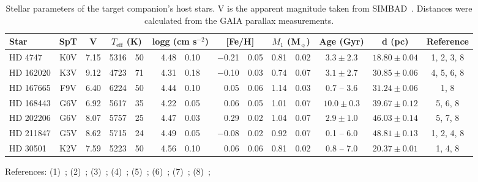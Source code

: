 
\begin{table*}
    \small
    \centering
    \begin{threeparttable}[b]
        \caption{Stellar parameters of the target companion's host stars. V is the apparent magnitude taken from {SIMBAD}~\citep{wenger_simbad_2000}. {Distances were calculated from the GAIA parallax measurements.}}
        \begin{tabular}{l c c r@{$~\pm~$}l r@{$~\pm~$}l r@{$~\pm~$}l r@{$~\pm~$}l c c c}
            \toprule
            Star & SpT & V & \multicolumn{2}{c}{\(T_{\textrm{eff}}\) (K)} &  \multicolumn{2}{c}{logg (cm s\(^{-2} \))}  & \multicolumn{2}{c}{[Fe/H]} &  \multicolumn{2}{c}{\(M_1\) (\textrm{M}\(_{\sun} \))} & Age (Gyr) & d (pc) & Reference\\
            \midrule
            {HD 4747}     & K0V & 7.15 & 5316 & 50 & 4.48 & 0.10  & $-$0.21 & 0.05 & 0.81 & 0.02  & $3.3 \pm 2.3$   & $18.80 \pm 0.04$ & 1, 2, 3, 8 \\
            {HD 162020} & K3V & 9.12 & 4723 & 71 & 4.31 & 0.18  & $-$0.10 & 0.03 & 0.74 & 0.07  & $3.1 \pm 2.7$   & $30.85 \pm 0.06$ & 4, 5, 6, 8 \\
            {HD 167665} & F9V & 6.40 & 6224 & 50 & 4.44 & 0.10  & 0.05       & 0.06 & 1.14 & 0.03  & 0.7 -- 3.6           & $ 31.24 \pm 0.06$ & 1, 8 \\
            {HD 168443} & G6V & 6.92 & 5617 & 35 & 4.22 & 0.05 & 0.06       & 0.05 & 1.01 & 0.07  & $10.0 \pm 0.3$  & $39.67 \pm 0.12$ & 5, 6, 8 \\
            {HD 202206} & G6V & 8.07 & 5757 & 25 & 4.47 & 0.03 & 0.29       & 0.02 & 1.04 & 0.07  & $2.9 \pm 1.0$    & $46.03 \pm 0.14$ & 5, 7, 8 \\
            {HD 211847} & G5V & 8.62 & 5715 & 24 & 4.49 & 0.05 & $-$0.08 & 0.02 & 0.92 & 0.07   & 0.1 -- 6.0            & $48.81 \pm 0.13 $ & 1, 2, 4, 8 \\
            {HD 30501}   & K2V & 7.59  & 5223 & 50 & 4.56 & 0.10 & 0.06       & 0.06 & 0.81 & 0.02  & 0.8 -- 7.0           & $20.37 \pm 0.01$ & 1, 4, 8 \\
            \bottomrule
        \end{tabular} \label{tab:starparams}
        \begin{tablenotes}
           \item[] References: (1)~\citet{sahlmann_search_2011}; (2)~\citet{santos_spectroscopic_2005}; (3)~\citet{crepp_trends_2016}; (4)~\citet{tsantaki_deriving_2013}; (5)~\cite{bonfanti_age_2016}; (6)~\citet{santos_spectroscopic_2004}; (7)~\citet{sousa_spectroscopic_2008}; (8)~\citet{collaboration_gaia_2018};
        \end{tablenotes}
    \end{threeparttable}
\end{table*}
